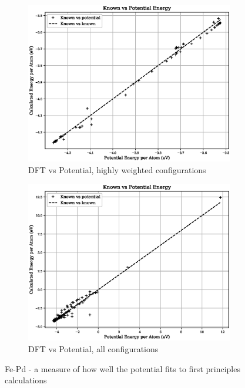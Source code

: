 \begin{figure}[htb]
\centering
\begin{subfigure}{.47\textwidth}
  \centering
  \includegraphics[width=.94\linewidth]{chapters/potentials_fe_pd_ru/fepd_potential/potential_known_energy_fit_set.eps}  
  \caption{DFT vs Potential, highly weighted configurations}
  \label{fig:fepd-energy-fit}
\end{subfigure}
\begin{subfigure}{.47\textwidth}
  \centering
  \includegraphics[width=.94\linewidth]{chapters/potentials_fe_pd_ru/fepd_potential/potential_known_energy_full_set.eps}  
  \caption{DFT vs Potential, all configurations}
  \label{fig:fepd-energy-full}
\end{subfigure}
\caption{Fe-Pd - a measure of how well the potential fits to first principles calculations}
\label{fig:fepd-energy}
\end{figure}

